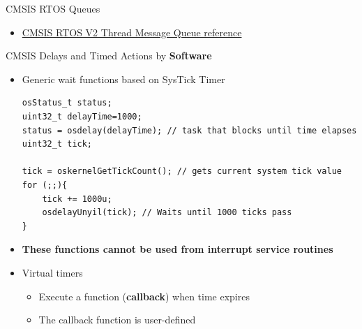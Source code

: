 \begin{frame}[fragile]{CMSIS RTOS Queues}
\begin{itemize}
         \item[] \href{https://arm-software.github.io/CMSIS_5/RTOS2/html/group__CMSIS__RTOS__Message.html}{CMSIS RTOS V2 Thread Message Queue reference}
    \end{itemize}
\end{frame}

\begin{frame}[fragile]{CMSIS Delays and Timed Actions by \textbf{Software}}
\begin{itemize}
    \item Generic wait functions based on SysTick Timer
    \begin{verbatim}
osStatus_t status;
uint32_t delayTime=1000;
status = osdelay(delayTime); // task that blocks until time elapses
uint32_t tick;

tick = oskernelGetTickCount(); // gets current system tick value
for (;;){
    tick += 1000u;
    osdelayUnyil(tick); // Waits until 1000 ticks pass
}
    \end{verbatim}
    \item \textbf{These functions cannot be used from interrupt service routines}
    \item Virtual timers
        \begin{itemize}
            \item Execute a function (\textbf{callback}) when time expires
            \item The callback function is user-defined
        \end{itemize}
\end{itemize}

\end{frame}

